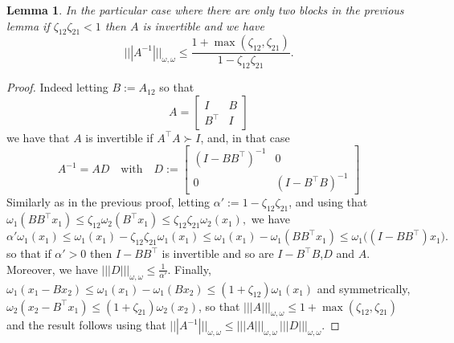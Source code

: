 \documentclass{article}
\def\xxi{\zeta}
\newtheorem{lemma}{Lemma}
\begin{document}
\begin{lemma}
\label{lem:two}
In the particular case where there are only two blocks in the previous lemma if $\xxi_{12}\xxi_{21}<1$ then $A$ is invertible and we have $$|||A^{-1}|||_{\omega,\omega} \leq \frac{1+\max(\xxi_{12},\xxi_{21})}{1-\xxi_{12}\xxi_{21}}.$$
\end{lemma}
\begin{proof}
Indeed letting $B:=A_{12}$ so that 
$$A=
\begin{bmatrix}
I & B\\
B^\top & I
\end{bmatrix}
$$
we have that $A$ is invertible if $A^\top A \succ I$, and, in that case
$$A^{-1}=A D \quad \text{with} \quad D:= 
\begin{bmatrix}
(I-BB^\top)^{-1} & 0\\
0 & (I-B^\top B)^{-1}
\end{bmatrix}
$$
Similarly as in the previous proof, letting $\alpha':=1-\xxi_{12} \xxi_{21}$, and using that $\omega_1(BB^\top x_1) \leq \xxi_{12} \omega_2(B^\top x_1) \leq  \xxi_{12} \xxi_{21} \omega_2(x_1),$ 
we have
$$\alpha' \omega_1(x_1) \leq \omega_1(x_1)- \xxi_{12} \xxi_{21} \omega_1(x_1) \leq \omega_1(x_1)- \omega_1(BB^\top x_1) \leq \omega_1 \big ( (I-BB^\top) x_1 \big ).$$
so that if $\alpha'>0$ then $I-BB^\top$ is invertible and so are  $I-B^\top B$,$D$ and $A$. Moreover, we have $|||D|||_{\omega,\omega} \leq \frac{1}{\alpha'}$. Finally, $\omega_1(x_1-Bx_2)\leq \omega_1(x_1)-\omega_1(Bx_2) \leq (1+\xxi_{12}) \omega_1(x_1)$ and symmetrically, $\omega_2(x_2-B^\top x_1) \leq (1+\xxi_{21}) \omega_2(x_2)$, so that $|||A|||_{\omega,\omega} \leq 1+\max(\xxi_{12},\xxi_{21})$ and the result follows using that $|||A^{-1}|||_{\omega,\omega} \leq |||A|||_{\omega,\omega} \, |||D|||_{\omega,\omega}$.
\end{proof}
\end{document}
